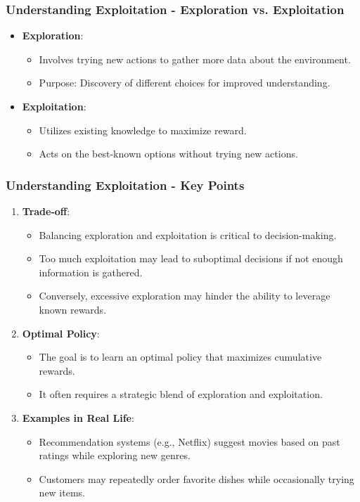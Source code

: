 \documentclass[aspectratio=169]{beamer}
\begin{document}
\begin{frame}[fragile]
    \frametitle{Understanding Exploitation - Exploration vs. Exploitation}
    \begin{itemize}
        \item \textbf{Exploration}: 
        \begin{itemize}
            \item Involves trying new actions to gather more data about the environment.
            \item Purpose: Discovery of different choices for improved understanding.
        \end{itemize}
        \item \textbf{Exploitation}: 
        \begin{itemize}
            \item Utilizes existing knowledge to maximize reward.
            \item Acts on the best-known options without trying new actions.
        \end{itemize}
    \end{itemize}
\end{frame}

\begin{frame}[fragile]
    \frametitle{Understanding Exploitation - Key Points}
    \begin{enumerate}
        \item \textbf{Trade-off}:
        \begin{itemize}
            \item Balancing exploration and exploitation is critical to decision-making.
            \item Too much exploitation may lead to suboptimal decisions if not enough information is gathered.
            \item Conversely, excessive exploration may hinder the ability to leverage known rewards.
        \end{itemize}
        \item \textbf{Optimal Policy}:
        \begin{itemize}
            \item The goal is to learn an optimal policy that maximizes cumulative rewards.
            \item It often requires a strategic blend of exploration and exploitation.
        \end{itemize}
        \item \textbf{Examples in Real Life}:
        \begin{itemize}
            \item Recommendation systems (e.g., Netflix) suggest movies based on past ratings while exploring new genres.
            \item Customers may repeatedly order favorite dishes while occasionally trying new items.
        \end{itemize}
    \end{enumerate}
\end{frame}
\end{document}
